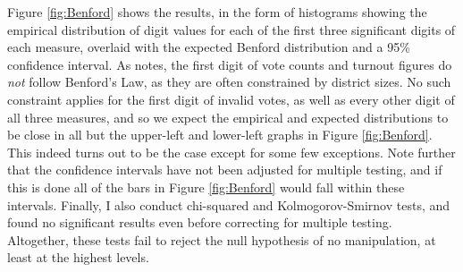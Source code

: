 \documentclass[12pt]{article}\usepackage[]{graphicx}\usepackage[]{color}
\newcommand{\1}{\mathbbm{1}}
\begin{document}
Figure \ref{fig:Benford} shows the results, in the form of histograms showing the empirical distribution of digit values for each of the first three significant digits of each measure, overlaid with the expected Benford distribution and a 95\% confidence interval. As \cite{Mebane2006} notes, the first digit of vote counts and turnout figures do \textit{not} follow Benford's Law, as they are often constrained by district sizes. No such constraint applies for the first digit of invalid votes, as well as every other digit of all three measures, and so we expect the empirical and expected distributions to be close in all but the upper-left and lower-left graphs in Figure \ref{fig:Benford}. This indeed turns out to be the case except for some few exceptions. Note further that the confidence intervals have not been adjusted for multiple testing, and if this is done all of the bars in Figure \ref{fig:Benford} would fall within these intervals. Finally, I also conduct chi-squared and Kolmogorov-Smirnov tests, and found no significant results even before correcting for multiple testing. Altogether, these tests fail to reject the null hypothesis of no manipulation, at least at the highest levels.
\end{document}
